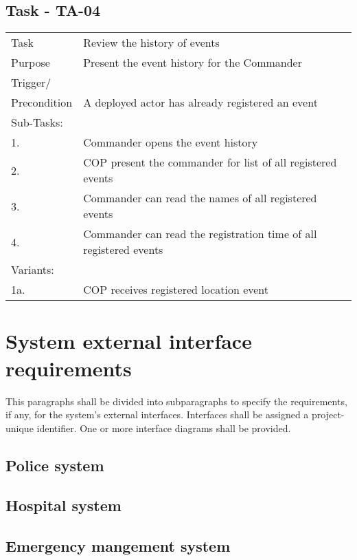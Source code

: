 \FloatBarrier
\newpage


\subsection{Task - TA-04}

\begin{longtable}{| p{2.5cm}  | p{10cm} |  }
	\hline
	Task & Review the history of events \\
	Purpose & Present the event history for the Commander \\
	Trigger/ &  \\ Precondition & A deployed actor has already registered an event \\
	\hline
	Sub-Tasks: & \\
	1. & Commander opens the event history \\
	2. & COP present the commander for list of all registered events  \\
	3. & Commander can read the names of all registered events \\
	4. & Commander can read the registration time of all registered events \\
	\hline
	Variants: & \\
	1a. & COP receives registered location event \\
	\hline
\end{longtable}

\section{System external interface requirements}
This paragraphs shall be divided into subparagraphs to specify the requirements, if any, for the system’s external interfaces. Interfaces shall be assigned a project-unique identifier. One or more interface diagrams shall be provided.

\subsection{Police system}

\subsection{Hospital system}

\subsection{Emergency mangement system}

